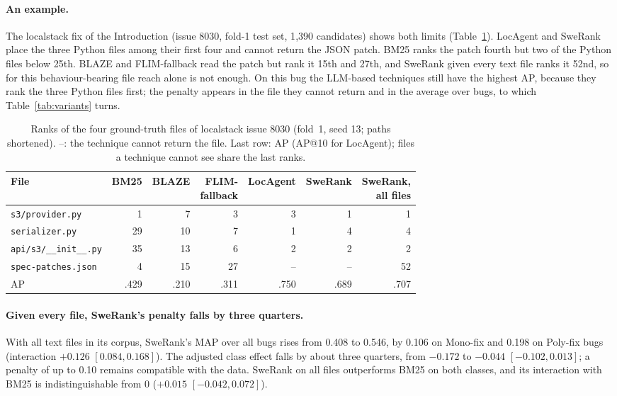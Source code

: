 \documentclass[a4paper,fleqn]{cas-dc}
\begin{document}
\paragraph{An example.} The localstack fix of the Introduction (issue 8030,
fold-1 test set, 1{,}390 candidates) shows both limits
(Table~\ref{tab:example}). LocAgent and SweRank place the three Python files
among their first four and cannot return the JSON patch. BM25 ranks the patch
fourth but two of the Python files below 25th. BLAZE and FLIM-fallback read the
patch but rank it 15th and 27th, and SweRank given every text file ranks it
52nd, so for this behaviour-bearing file reach alone is not enough. On this
bug the LLM-based techniques still have the highest AP, because they rank the
three Python files first; the penalty appears in the file they cannot return
and in the average over bugs, to which Table~\ref{tab:variants} turns.

\begin{table}[t]
\caption{Ranks of the four ground-truth files of localstack issue 8030 (fold~1, seed 13; paths shortened). --: the technique cannot return the file. Last row: AP (AP@10 for LocAgent); files a technique cannot see share the last ranks.}
\label{tab:example}
\footnotesize
\setlength{\tabcolsep}{2.5pt}
\begin{adjustbox}{max width=\linewidth}\begin{tabular}{lrrrrrr}
\toprule
File & BM25 & BLAZE & \makecell[r]{FLIM-\\fallback} & LocAgent & SweRank & \makecell[r]{SweRank,\\all files} \\
\midrule
\texttt{s3/provider.py} & 1 & 7 & 3 & 3 & 1 & 1 \\
\texttt{serializer.py} & 29 & 10 & 7 & 1 & 4 & 4 \\
\texttt{api/s3/\_\_init\_\_.py} & 35 & 13 & 6 & 2 & 2 & 2 \\
\texttt{spec-patches.json} & 4 & 15 & 27 & -- & -- & 52 \\
\midrule
AP & .429 & .210 & .311 & .750 & .689 & .707 \\
\bottomrule
\end{tabular}\end{adjustbox}
\end{table}



\paragraph{Given every file, SweRank's penalty falls by three quarters.} With
all text files in its corpus, SweRank's MAP over all bugs rises from 0.408 to
0.546, by 0.106 on Mono-fix and 0.198 on Poly-fix bugs (interaction $+0.126$
$[0.084, 0.168]$). The adjusted class effect falls by about three quarters,
from $-0.172$ to $-0.044$ $[-0.102, 0.013]$; a penalty of up to 0.10 remains
compatible with the data. SweRank on all files outperforms BM25 on both
classes, and its interaction with BM25 is indistinguishable from 0 ($+0.015$
$[-0.042, 0.072]$).
\end{document}
